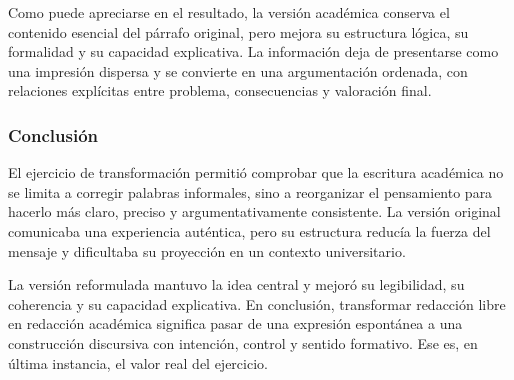 Como puede apreciarse en el resultado, la versión académica conserva el contenido esencial del párrafo original, pero mejora su estructura lógica, su formalidad y su capacidad explicativa. La información deja de presentarse como una impresión dispersa y se convierte en una argumentación ordenada, con relaciones explícitas entre problema, consecuencias y valoración final.

\subsubsection{Conclusión}

El ejercicio de transformación permitió comprobar que la escritura académica no se limita a corregir palabras informales, sino a reorganizar el pensamiento para hacerlo más claro, preciso y argumentativamente consistente. La versión original comunicaba una experiencia auténtica, pero su estructura reducía la fuerza del mensaje y dificultaba su proyección en un contexto universitario.

La versión reformulada mantuvo la idea central y mejoró su legibilidad, su coherencia y su capacidad explicativa. En conclusión, transformar redacción libre en redacción académica significa pasar de una expresión espontánea a una construcción discursiva con intención, control y sentido formativo. Ese es, en última instancia, el valor real del ejercicio.
